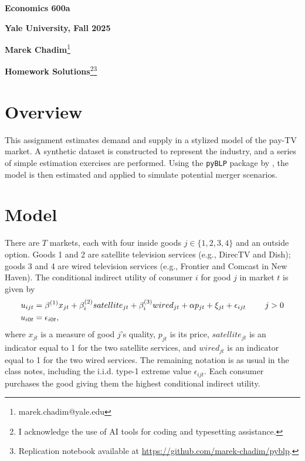 \documentclass[english,11pt]{article}
\begin{document}
\begin{center}
\textbf{Economics 600a}

\textbf{Yale University, Fall 2025}

\textbf{Marek Chadim}\footnote{marek.chadim@yale.edu}

\textbf{Homework Solutions}\footnote{I acknowledge the use of AI tools for coding and typesetting assistance.}\footnote{Replication notebook available at \href{https://github.com/marek-chadim/pyblp}{https://github.com/marek-chadim/pyblp}.}


\end{center}

\bigskip

\section{Overview}

This assignment estimates demand and supply in a stylized model of the pay-TV market. A synthetic dataset is constructed to represent the industry, and a series of simple estimation exercises are performed. Using the \texttt{pyBLP} package by \citet{conlon2020pyblp}, the model is then estimated and applied to simulate potential merger scenarios.

\section{Model}

There are $T$ markets, each with four inside goods $j\in
\{1,2,3,4\}$ and an outside option. Goods 1 and 2 are satellite television
services (e.g., DirecTV and Dish); goods 3 and 4 are wired television
services (e.g., Frontier and Comcast in New Haven).
The conditional indirect utility of consumer $i$ for good $j$ in market $t$
is given by
\begin{align*}
u_{ijt}& =\beta ^{\left( 1\right) }x_{jt}+\beta
_{i}^{(2)}satellite_{jt}+\beta _{i}^{(3)}wired_{jt}+\alpha p_{jt}+\xi
_{jt}+\epsilon _{ijt}\text{ \qquad }j>0 \\
u_{i0t}& =\epsilon _{i0t},
\end{align*}%
where $x_{jt}$ is a measure of good $j$'s quality, $p_{jt}$ is its price, $%
satellite_{jt}$ is an indicator equal to 1 for the two satellite services,
and $wired_{jt}$ is an indicator equal to 1 for the two wired services. The
remaining notation is as usual in the class notes, including the i.i.d.
type-1 extreme value $\epsilon _{ijt}$.  Each consumer purchases the good giving them the highest conditional indirect utility.
\end{document}
